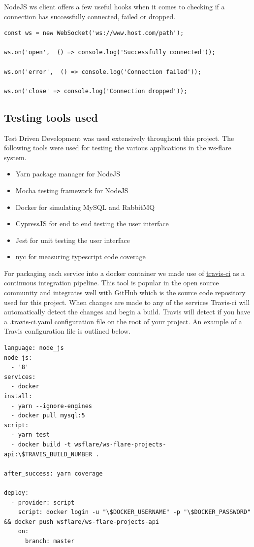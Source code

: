 NodeJS ws client offers a few useful hooks when it comes to checking if a connection has successfully connected, failed or dropped. 

\begin{verbatim}
const ws = new WebSocket('ws://www.host.com/path');
 
ws.on('open',  () => console.log('Successfully connected'));

ws.on('error',  () => console.log('Connection failed'));

ws.on('close' => console.log('Connection dropped'));
\end{verbatim}

\subsection{Testing tools used}

Test Driven Development was used extensively throughout this project. The following tools were used for testing the various applications in the ws-flare system.

\begin{itemize}
  \item Yarn package manager for NodeJS 
  \item Mocha testing framework for NodeJS
  \item Docker for simulating MySQL and RabbitMQ
  \item CypressJS for end to end testing the user interface
  \item Jest for unit testing the user interface
  \item nyc for measuring typescript code coverage
\end{itemize}

For packaging each service into a docker container we made use of \href{https://travis-ci.org/}{travis-ci} as a continuous integration pipeline. This tool is popular in the open source community and integrates well with GitHub which is the source code repository used for this project. When changes are made to any of the services Travis-ci will automatically detect the changes and begin a build. Travis will detect if you have a .travis-ci.yaml configuration file on the root of your project. An example of a Travis configuration file is outlined below.

\begin{verbatim}
language: node_js
node_js:
  - '8'
services:
  - docker
install:
  - yarn --ignore-engines
  - docker pull mysql:5
script:
  - yarn test
  - docker build -t wsflare/ws-flare-projects-api:\$TRAVIS_BUILD_NUMBER .

after_success: yarn coverage

deploy:
  - provider: script
    script: docker login -u "\$DOCKER_USERNAME" -p "\$DOCKER_PASSWORD" && docker push wsflare/ws-flare-projects-api
    on:
      branch: master
\end{verbatim}

